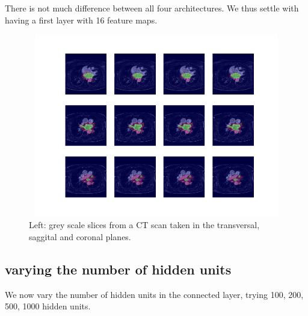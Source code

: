 There is not much difference between all four architectures. We thus settle with having a first layer with 16 feature maps.

\begin{figure}
\centering
\includegraphics[trim=2.5cm 1.5cm 2cm 1.5cm, clip=true, height=80mm, width=150mm]{Chapter3/mask_results_varying_number_of_feature_maps.png}
\caption{Left: grey scale slices from a CT scan taken in the transversal, saggital and coronal planes.}
\end{figure}

\subsection{varying the number of hidden units}

We now vary the number of hidden units in the connected layer, trying 100, 200, 500, 1000 hidden units. \\

